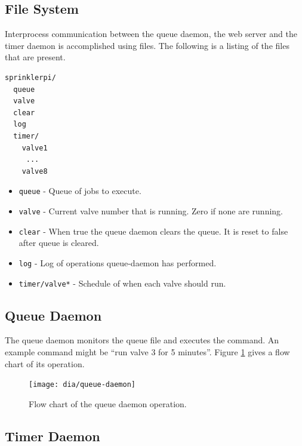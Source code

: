 \documentclass{article}
\begin{document}
\FloatBarrier
\subsection{File System}

Interprocess communication between the queue daemon, the web server
and the timer daemon is accomplished using files.
The following is a listing of the files that are present.

\begin{verbatim}
sprinklerpi/
  queue
  valve
  clear
  log
  timer/
    valve1
     ...
    valve8
\end{verbatim}

\begin{itemize}
    \item \verb+queue+ - Queue of jobs to execute.
    \item \verb+valve+ - Current valve number that is running.
        Zero if none are running.
    \item \verb+clear+ - When true the queue daemon clears the queue.
        It is reset to false after queue is cleared.
    \item \verb+log+ - Log of operations queue-daemon has performed.
    \item \verb+timer/valve*+ - Schedule of when each valve should run.
\end{itemize}

\FloatBarrier
\subsection{Queue Daemon}

The queue daemon monitors the queue file and executes the command.
An example command might be ``run valve 3 for 5 minutes''.
Figure \ref{fig:queue-daemon} gives a flow chart of its operation.

\begin{figure}[htbp!]
\begin{center}
\texttt{[image: dia/queue-daemon]}
\end{center}
\caption{Flow chart of the queue daemon operation.}
\label{fig:queue-daemon}
\end{figure}


\clearpage
\FloatBarrier
\subsection{Timer Daemon}
\end{document}
